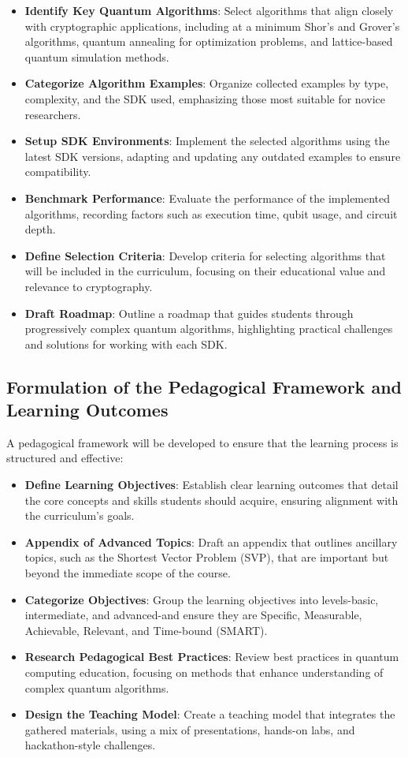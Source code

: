 \documentclass[11pt,a4paper]{article}
\begin{document}
\begin{itemize}
	\item \textbf{Identify Key Quantum Algorithms}: Select algorithms that align closely with cryptographic applications, including at a minimum 
		Shor’s and Grover’s algorithms, quantum annealing for optimization problems, and lattice-based quantum simulation methods.
	\item \textbf{Categorize Algorithm Examples}: Organize collected examples by type, complexity, and the SDK used, emphasizing those most 
		suitable for novice researchers.
	\item \textbf{Setup SDK Environments}: Implement the selected algorithms using the latest SDK versions, adapting and updating any outdated 
		examples to ensure compatibility.
	\item \textbf{Benchmark Performance}: Evaluate the performance of the implemented algorithms, recording factors such as execution time, 
		qubit usage, and circuit depth.
	\item \textbf{Define Selection Criteria}: Develop criteria for selecting algorithms that will be included in the curriculum, focusing 
		on their educational value and relevance to cryptography.
	\item \textbf{Draft Roadmap}: Outline a roadmap that guides students through progressively complex quantum algorithms, highlighting practical 
		challenges and solutions for working with each SDK.
\end{itemize}

\subsection{Formulation of the Pedagogical Framework and Learning Outcomes}

A pedagogical framework will be developed to ensure that the learning process is structured and effective:

\begin{itemize}
	\item \textbf{Define Learning Objectives}: Establish clear learning outcomes that detail the core concepts and skills students should 
		acquire, ensuring alignment with the curriculum’s goals.
	\item \textbf{Appendix of Advanced Topics}: Draft an appendix that outlines ancillary topics, such as the Shortest Vector Problem (SVP), 
		that are important but beyond the immediate scope of the course.
	\item \textbf{Categorize Objectives}: Group the learning objectives into levels-basic, intermediate, and advanced-and ensure they are 
		Specific, Measurable, Achievable, Relevant, and Time-bound (SMART).
	\item \textbf{Research Pedagogical Best Practices}: Review best practices in quantum computing education, focusing on methods that enhance 
		understanding of complex quantum algorithms.
	\item \textbf{Design the Teaching Model}: Create a teaching model that integrates the gathered materials, using a mix of presentations, 
		hands-on labs, and hackathon-style challenges.
\end{itemize}
\end{document}
